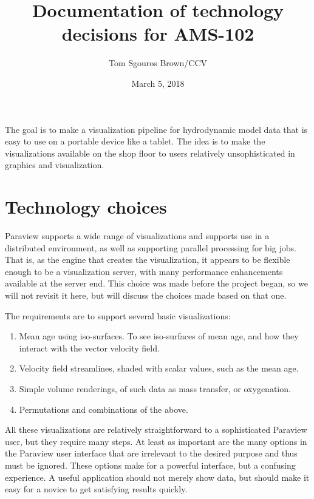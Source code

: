 \documentclass[11pt]{article}
\newcommand{\doctitle}{Documentation of technology decisions for AMS-102}
\newcommand{\docauthor}{Tom Sgouros Brown/CCV}
\newcommand{\docdate}{March 5, 2018}
\begin{document}
\title{\doctitle}\author{\docauthor}\date{\docdate}
\maketitle

The goal is to make a visualization pipeline for hydrodynamic model data
that is easy to use on a portable device like a tablet.  The idea is
to make the visualizations available on the shop floor to
users relatively unsophisticated in graphics and visualization.

\begin{center}\setlength{\fboxsep}{10pt}
\end{center}


\section{Technology choices}

Paraview supports a wide range of visualizations and supports use in a
distributed environment, as well as supporting parallel processing for
big jobs.  That is, as the engine that creates the visualization, it
appears to be flexible enough to be a visualization server, with many
performance enhancements available at the server end.  This choice was
made before the project began, so we will not revisit it here, but
will discuss the choices made based on that one.

The requirements are to support several basic visualizations:

\begin{enumerate}

\item Mean age using iso-surfaces.  To see iso-surfaces of mean age,
  and how they interact with the vector velocity field.

\item Velocity field streamlines, shaded with scalar values, such as
  the mean age.

\item Simple volume renderings, of such data as mass transfer, or
  oxygenation.

\item Permutations and combinations of the above.
\end{enumerate}


All these visualizations are relatively straightforward to a
sophisticated Paraview user, but they require many steps.  At least as
important are the many options in the Paraview user interface that are
irrelevant to the desired purpose and thus must be ignored.  These
options make for a powerful interface, but a confusing experience.  A
useful application should not merely show data, but should make it
easy for a novice to get satisfying results quickly.
\end{document}
